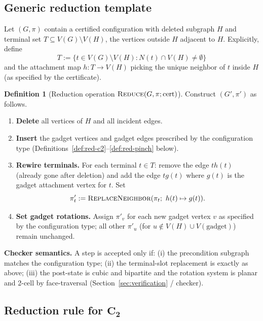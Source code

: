 \documentclass[12pt]{article}
\theoremstyle{definition}
\newtheorem{definition}[theorem]{Definition}
\begin{document}
\subsection{Generic reduction template}
\label{subsec:generic-reduce}

Let $(G,\pi)$ contain a certified configuration with deleted subgraph $H$ and
terminal set $T \subseteq V(G)\setminus V(H)$, the vertices outside $H$ adjacent to $H$.
Explicitly, define
\[
  T := \{ t \in V(G)\setminus V(H) : N(t) \cap V(H) \neq \emptyset \}
\]
and the attachment map $h: T \to V(H)$ picking the unique neighbor of $t$ inside $H$ (as specified by the certificate).

\begin{definition}[Reduction operation $\textsc{Reduce}(G,\pi;\mathrm{cert})$]
\label{def:reduce-op}
Construct $(G',\pi')$ as follows.
\begin{enumerate}
  \item \textbf{Delete} all vertices of $H$ and all incident edges.
  \item \textbf{Insert} the gadget vertices and gadget edges prescribed by the
        configuration type (Definitions~\ref{def:red-c2}--\ref{def:red-pinch} below).
  \item \textbf{Rewire terminals.}  For each terminal $t\in T$:
        remove the edge $t h(t)$ (already gone after deletion) and add the edge
        $t g(t)$ where $g(t)$ is the gadget attachment vertex for $t$.
        Set
        \[
          \pi'_t := \textsc{ReplaceNeighbor}(\pi_t;\ h(t)\mapsto g(t)).
        \]
  \item \textbf{Set gadget rotations.}  Assign $\pi'_v$ for each new gadget
        vertex $v$ as specified by the configuration type; all other
        $\pi'_u$ (for $u\notin V(H)\cup V(\text{gadget})$) remain unchanged.
\end{enumerate}
\end{definition}

\medskip
\noindent\textbf{Checker semantics.}
A step is accepted only if:
(i) the precondition subgraph matches the configuration type;
(ii) the terminal-slot replacement is exactly as above;
(iii) the post-state is cubic and bipartite and the rotation system is planar
and 2-cell by face-traversal (Section~\ref{sec:verification} / checker).

\subsection{Reduction rule for $\mathbf{C_2}$}
\label{subsec:red-c2}
\end{document}
